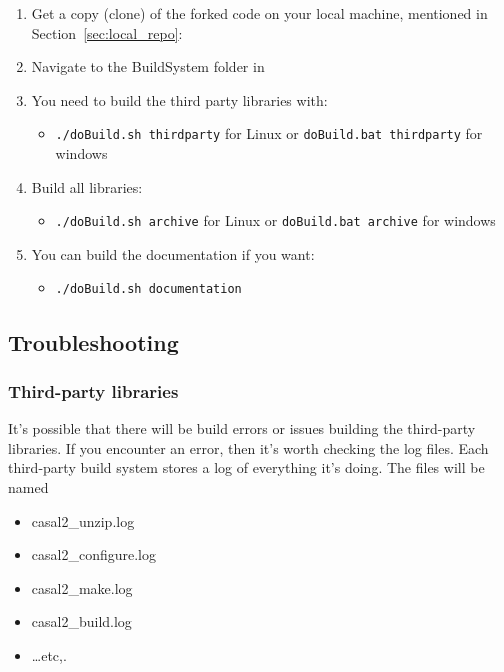 \begin{enumerate}
	\item Get a copy (clone) of the forked code on your local machine, mentioned in Section~\ref{sec:local_repo}:
	\item Navigate to the BuildSystem folder in 
	\item You need to build the third party libraries with:
	\begin{itemize}
	    \item \texttt{./doBuild.sh thirdparty} for Linux or \texttt{doBuild.bat thirdparty} for windows
	\end{itemize}
	\item Build all libraries:
	\begin{itemize}
		\item \texttt{./doBuild.sh archive} for Linux or \texttt{doBuild.bat archive} for windows
	\end{itemize}
	\item You can build the documentation if you want:
	\begin{itemize}
		\item \texttt{./doBuild.sh documentation}
	\end{itemize}
\end{enumerate}

\subsection{Troubleshooting}

\subsubsection{Third-party libraries}

It's possible that there will be build errors or issues building the third-party libraries. If you encounter an error, then it’s worth checking the log files. Each third-party build system stores a log of everything it’s doing. The files will be named

\begin{itemize}
	\item casal2\_unzip.log
	\item casal2\_configure.log
	\item casal2\_make.log
	\item casal2\_build.log
	\item \dots etc,.
\end{itemize}

